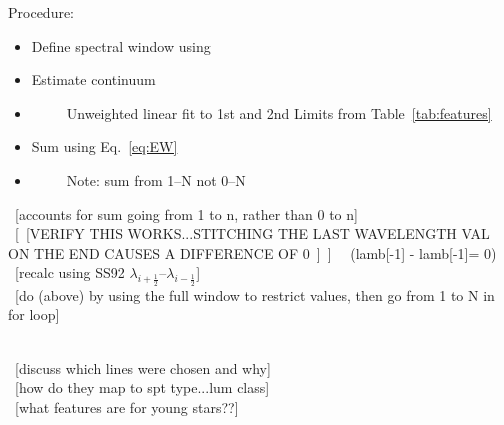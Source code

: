 

Procedure:\\
\begin{itemize}
	\item{} Define spectral window using
	\item{} Estimate continuum
	\item{}~~~~~Unweighted linear fit to 1st and 2nd Limits from Table~\ref{tab:features}
	\item{} Sum using Eq.~\ref{eq:EW}
	\item{}~~~~~Note: sum from 1--N not 0--N
\end{itemize}



~[accounts for sum going from 1 to n, rather than 0 to n]\\
~[~[VERIFY THIS WORKS...STITCHING THE LAST WAVELENGTH VAL ON THE END CAUSES A DIFFERENCE OF 0~]~] ~~(lamb[-1] - lamb[-1]= 0)\\

~[recalc using SS92 $\lambda_{i+\frac{1}{2}}$--$\lambda_{i-\frac{1}{2}}$]\\
~[do (above) by using the full window to restrict values, then go from 1 to N in for loop]


 

~\\~[discuss which lines were chosen and why]\\
~[how do they map to spt type...lum class]\\
~[what features are for young stars??]\\




